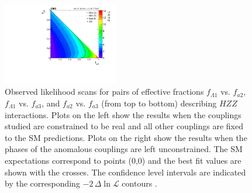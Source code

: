\begin{figure}
	\includegraphics[width=0.45\textwidth]{Spin_Parity/fa2_vs_fa3_Profile.pdf}
	\caption[Observed likelihood scans for pairs of effective fractions $f_{\Lambda1}$ vs. $f_{a2}$,
	$f_{\Lambda1}$ vs. $f_{a3}$, and $f_{a2}$ vs. $f_{a3}$ (from top to bottom) describing $HZZ$ interactions.
	Plots on the left show the results when the couplings studied are constrained to be real
	and all other couplings are fixed to the SM predictions.
	Plots on the right show the results when the phases of the anomalous couplings are left unconstrained.
	The SM expectations correspond to points (0,0) and the best fit values are shown with the crosses.
	The confidence level intervals are indicated by the corresponding $-2\,\Delta\ln\mathcal{L}$ contours.]{
	Observed likelihood scans for pairs of effective fractions $f_{\Lambda1}$ vs. $f_{a2}$,
	$f_{\Lambda1}$ vs. $f_{a3}$, and $f_{a2}$ vs. $f_{a3}$ (from top to bottom) describing $HZZ$ interactions.
	Plots on the left show the results when the couplings studied are constrained to be real
	and all other couplings are fixed to the SM predictions.
	Plots on the right show the results when the phases of the anomalous couplings are left unconstrained.
	The SM expectations correspond to points (0,0) and the best fit values are shown with the crosses.
	The confidence level intervals are indicated by the corresponding $-2\,\Delta\ln\mathcal{L}$ contours \cite{Khachatryan:2014kca}.
	}
	\label{fig:results_ZZ_2D}

\end{figure}

